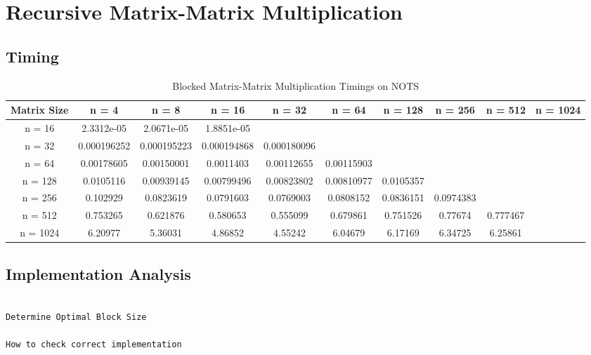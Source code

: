 \documentclass{article}
\begin{document}
\section{Recursive Matrix-Matrix Multiplication}

\subsection{Timing}

\begin{table}[ht!]
    \caption{Blocked Matrix-Matrix Multiplication Timings on NOTS}
    \centering
    \begin{tabular}{|c|c|c|c|c|c|c|c|c|c|}
        \hline
        Matrix Size & n = 4 & n = 8 & n = 16 & n = 32 & n = 64 & n = 128 & n = 256 & n = 512 & n = 1024 \\
        \hline
        n = 16 & 2.3312e-05 & 2.0671e-05 & 1.8851e-05 \\
        \hline
        n = 32 & 0.000196252 & 0.000195223 & 0.000194868 & 0.000180096 \\
        \hline
        n = 64 & 0.00178605 & 0.00150001 & 0.0011403 & 0.00112655 & 0.00115903 \\
        \hline
        n = 128 & 0.0105116 & 0.00939145 & 0.00799496 & 0.00823802 & 0.00810977 & 0.0105357 \\
        \hline
        n = 256 & 0.102929 & 0.0823619 & 0.0791603 & 0.0769003 & 0.0808152 & 0.0836151 & 0.0974383 \\
        \hline
        n = 512 & 0.753265 & 0.621876 & 0.580653 & 0.555099 & 0.679861 & 0.751526 & 0.77674 & 0.777467 \\
        \hline 
        n = 1024 & 6.20977 & 5.36031 & 4.86852 & 4.55242 & 6.04679 & 6.17169 & 6.34725 & 6.25861 \\
        \hline
    \end{tabular}
\end{table}

\subsection{Implementation Analysis}
\begin{verbatim}

Determine Optimal Block Size

How to check correct implementation

\end{verbatim}
\end{document}

